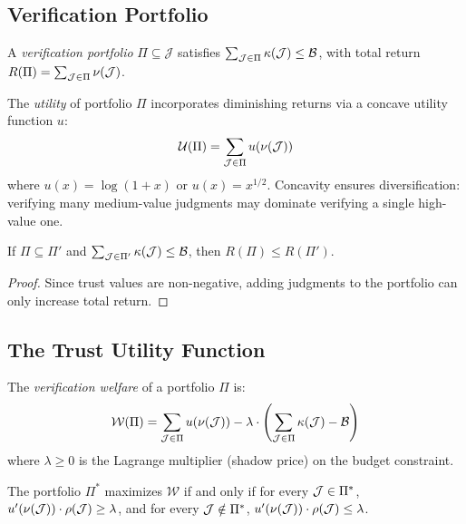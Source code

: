 \documentclass[11pt]{article}
\newcommand{\VerifBudget}{\mathcal{B}}
\newcommand{\TrustValue}{\nu}
\newcommand{\VerifCost}{\kappa}
\newcommand{\TrustReturn}{\rho}
\newcommand{\Util}{\mathcal{U}}
\newcommand{\Welfare}{\mathcal{W}}
\newcommand{\Shadow}{\lambda}
\begin{document}
\subsection{Verification Portfolio}
\begin{definition}\label{def:portfolio}
A \emph{verification portfolio} $\Pi \subseteq \mathcal{J}$ satisfies
$\sum_{\J \in \Pi} \VerifCost(\J) \leq \VerifBudget$, with total
return $R(\Pi) = \sum_{\J \in \Pi} \TrustValue(\J)$.
\end{definition}

\begin{definition}\label{def:portfolio-utility}
The \emph{utility} of portfolio $\Pi$ incorporates diminishing returns
via a concave utility function $u$:
\[
  \Util(\Pi) = \sum_{\J \in \Pi} u(\TrustValue(\J))
\]
where $u(x) = \log(1 + x)$ or $u(x) = x^{1/2}$.  Concavity ensures
diversification: verifying many medium-value judgments may dominate
verifying a single high-value one.
\end{definition}

\begin{proposition}\label{prop:mono}
If $\Pi \subseteq \Pi'$ and $\sum_{\J \in \Pi'} \VerifCost(\J) \leq
\VerifBudget$, then $R(\Pi) \leq R(\Pi')$.
\end{proposition}

\begin{proof}
Since trust values are non-negative, adding judgments to the
portfolio can only increase total return.
\end{proof}

\subsection{The Trust Utility Function}

\begin{definition}\label{def:welfare-func}
The \emph{verification welfare} of a portfolio $\Pi$ is:
\[
  \Welfare(\Pi) = \sum_{\J \in \Pi} u(\TrustValue(\J)) -
  \Shadow \cdot \left(\sum_{\J \in \Pi} \VerifCost(\J) - \VerifBudget\right)
\]
where $\Shadow \geq 0$ is the Lagrange multiplier (shadow price) on
the budget constraint.
\end{definition}

\begin{theorem}\label{thm:welfare-max}
The portfolio $\Pi^*$ maximizes $\Welfare$ if and only if for every
$\mathcal{J} \in \Pi^*$, $u'(\TrustValue(\J)) \cdot \TrustReturn(\J) \geq
\Shadow$, and for every $\mathcal{J} \notin \Pi^*$,
$u'(\TrustValue(\J)) \cdot \TrustReturn(\J) \leq \Shadow$.
\end{theorem}
\end{document}
